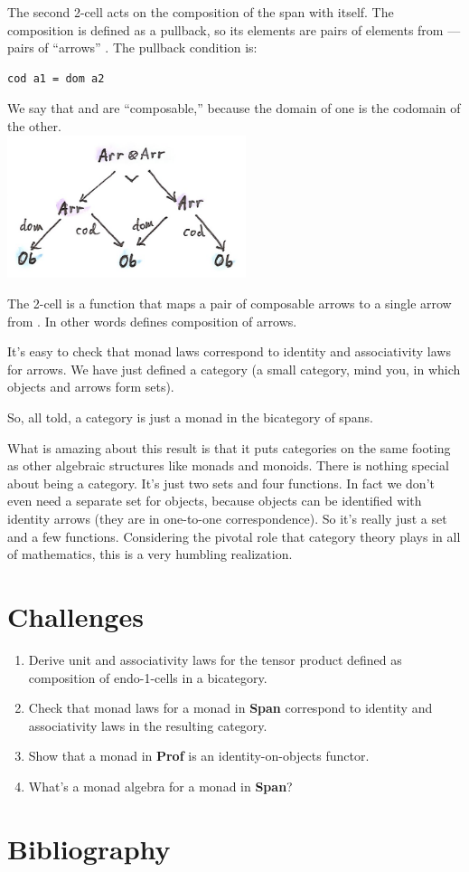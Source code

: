 The second 2-cell  acts on the composition of the span
 with itself. The composition is defined as a pullback, so
its elements are pairs of elements from  --- pairs of
``arrows'' . The pullback condition is:

\begin{Verbatim}[commandchars=\\\{\}]
cod a1 = dom a2
\end{Verbatim}

We say that  and  are ``composable,'' because the
domain of one is the codomain of the other.\\
\includegraphics[width=2.75000in]{images/spanmul.png}

The 2-cell  is a function that maps a pair of composable
arrows  to a single arrow  from
. In other words  defines composition of arrows.

It's easy to check that monad laws correspond to identity and
associativity laws for arrows. We have just defined a category (a small
category, mind you, in which objects and arrows form sets).

So, all told, a category is just a monad in the bicategory of spans.

What is amazing about this result is that it puts categories on the same
footing as other algebraic structures like monads and monoids. There is
nothing special about being a category. It's just two sets and four
functions. In fact we don't even need a separate set for objects,
because objects can be identified with identity arrows (they are in
one-to-one correspondence). So it's really just a set and a few
functions. Considering the pivotal role that category theory plays in
all of mathematics, this is a very humbling realization.

\section{Challenges}\label{challenges}

\begin{enumerate}
\tightlist
\item
  Derive unit and associativity laws for the tensor product defined as
  composition of endo-1-cells in a bicategory.
\item
  Check that monad laws for a monad in \textbf{Span} correspond to
  identity and associativity laws in the resulting category.
\item
  Show that a monad in \textbf{Prof} is an identity-on-objects functor.
\item
  What's a monad algebra for a monad in \textbf{Span}?
\end{enumerate}

\section{Bibliography}\label{bibliography}
